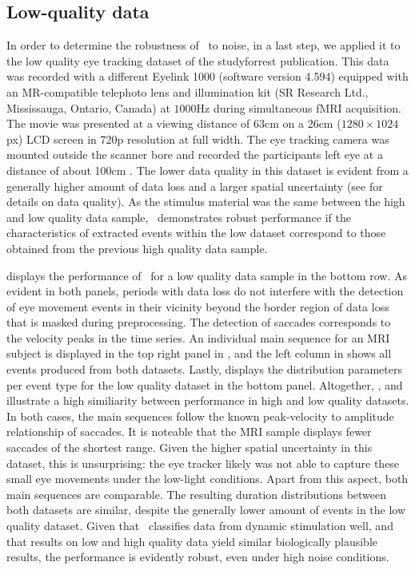 \subsection*{Low-quality data}\label{ana_3}

In order to determine the robustness of \remodnav\ to noise, in a last step, we
applied it to the low quality eye tracking dataset of the studyforrest
publication. This data was recorded with a different Eyelink 1000 (software
version 4.594) equipped with an MR-compatible telephoto lens and illumination
kit (SR Research Ltd., Mississauga, Ontario, Canada) at $1000$Hz during
simultaneous fMRI acquisition. The movie was presented at a viewing distance of
$63$cm on a 26cm ($1280\times1024$px) LCD screen in 720p resolution at full
width. The eye tracking camera was mounted outside the scanner bore and
recorded the participants left eye at a distance of about 100cm
\citep{Hanke2016}.  The lower data quality in this dataset is evident from a
generally higher amount of data loss and a larger spatial uncertainty (see
\citet{Hanke2016} for details on data quality). As the stimulus material was
the same between the high and low quality data sample, \remodnav\ demonstrates
robust performance if the characteristics of extracted events within the low
dataset correspond to those obtained from the previous high quality data
sample.


 displays the performance of \remodnav\ for a low
quality data sample in the bottom row.  As evident in both panels, periods with
data loss do not interfere with the detection of eye movement events in their
vicinity beyond the border region of data loss that is masked during
preprocessing. The detection of saccades corresponds to the velocity peaks in
the time series. An individual main sequence for an MRI subject is displayed
in the top right panel in , and the left column in
 shows all events produced from both datasets. Lastly,
 displays the distribution parameters per event type for the low
quality dataset in the bottom panel.
Altogether, ,  and
 illustrate a high similiarity between performance in high
and low quality datasets. In both cases, the main sequences follow the known
peak-velocity to amplitude relationship of saccades. It is noteable that the
MRI sample displays fewer saccades of the shortest range. Given the higher
spatial uncertainty in this dataset, this is unsurprising: the eye tracker
likely was not able to capture these small eye movements under the low-light
conditions. Apart from this aspect, both main sequences are comparable. The
resulting duration distributions between both datasets are similar, despite the
generally lower amount of events in the low quality dataset. Given
that \remodnav\ classifies data from dynamic stimulation well, and that results
on low and high quality data yield similar biologically plausible results, the
performance is evidently robust, even under high noise conditions.

